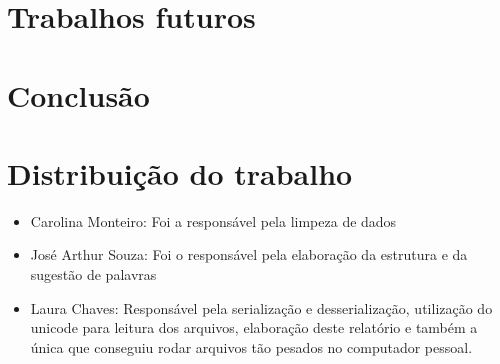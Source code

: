 \documentclass{article}
\begin{document}
\section{Trabalhos futuros}

\section{Conclusão}

\section{Distribuição do trabalho}

\begin{itemize}
    \item Carolina Monteiro: Foi a responsável pela limpeza de dados
    \item José Arthur Souza: Foi o responsável pela elaboração da estrutura e da sugestão de palavras
    \item Laura Chaves: Responsável pela serialização e desserialização, utilização do unicode para leitura dos arquivos, elaboração deste relatório e também a única que conseguiu rodar arquivos tão pesados no computador pessoal.
\end{itemize}
\end{document}
